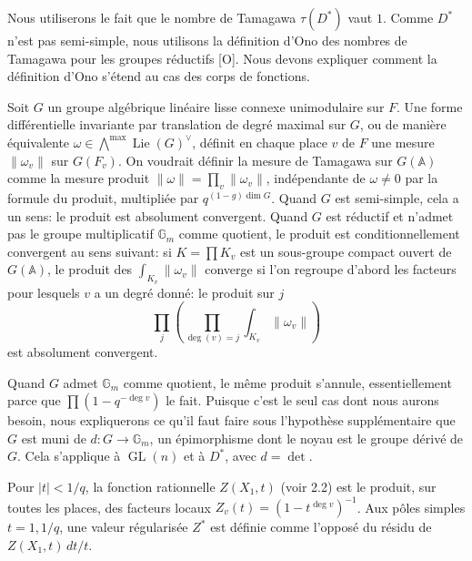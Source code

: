 \documentclass[10pt]{article}
\newcommand{\Adele}{\mathbb A}
\newcommand{\Gm}{\mathbb G_m}
\newcommand{\GL}{\operatorname{GL}}
\newcommand{\Lie}{\operatorname{Lie}}
\newcommand{\degm}{\operatorname{deg}}
\newcommand{\detm}{\operatorname{det}}
\theoremstyle{deligne}
\newcommand{\heading}[1]{\vspace{0.7em}\noindent{\bfseries #1}\quad}
\begin{document}
\heading{3.8.} Nous utiliserons le fait que le nombre de Tamagawa $\tau(D^*)$ vaut $1$. Comme $D^*$ n'est pas semi-simple, nous utilisons la définition d'Ono des nombres de Tamagawa pour les groupes réductifs [O]. Nous devons expliquer comment la définition d'Ono s'étend au cas des corps de fonctions.

Soit $G$ un groupe algébrique linéaire lisse connexe unimodulaire sur $F$. Une forme différentielle invariante par translation de degré maximal sur $G$, ou de manière équivalente $\omega\in\bigwedge^{\max}\Lie(G)^\vee$, définit en chaque place $v$ de $F$ une mesure $\|\omega_v\|$ sur $G(F_v)$. On voudrait définir la mesure de Tamagawa sur $G(\Adele)$ comme la mesure produit $\|\omega\|=\prod_v\|\omega_v\|$, indépendante de $\omega\ne0$ par la formule du produit, multipliée par $q^{(1-g)\dim G}$. Quand $G$ est semi-simple, cela a un sens: le produit est absolument convergent. Quand $G$ est réductif et n'admet pas le groupe multiplicatif $\Gm$ comme quotient, le produit est conditionnellement convergent au sens suivant: si $K=\prod K_v$ est un sous-groupe compact ouvert de $G(\Adele)$, le produit des $\int_{K_v}\|\omega_v\|$ converge si l'on regroupe d'abord les facteurs pour lesquels $v$ a un degré donné: le produit sur $j$
\[
\prod_j\left(\prod_{\degm(v)=j}\int_{K_v}\|\omega_v\|\right)
\]
est absolument convergent.

Quand $G$ admet $\Gm$ comme quotient, le même produit s'annule, essentiellement parce que $\prod(1-q^{-\degm v})$ le fait. Puisque c'est le seul cas dont nous aurons besoin, nous expliquerons ce qu'il faut faire sous l'hypothèse supplémentaire que $G$ est muni de $d:G\to\Gm$, un épimorphisme dont le noyau est le groupe dérivé de $G$. Cela s'applique à $\GL(n)$ et à $D^*$, avec $d=\detm$.

Pour $|t|<1/q$, la fonction rationnelle $Z(X_1,t)$ (voir 2.2) est le produit, sur toutes les places, des facteurs locaux $Z_v(t)=(1-t^{\degm v})^{-1}$. Aux pôles simples $t=1,1/q$, une valeur régularisée $Z^*$ est définie comme l'opposé du résidu de $Z(X_1,t)\,dt/t$.
\end{document}
